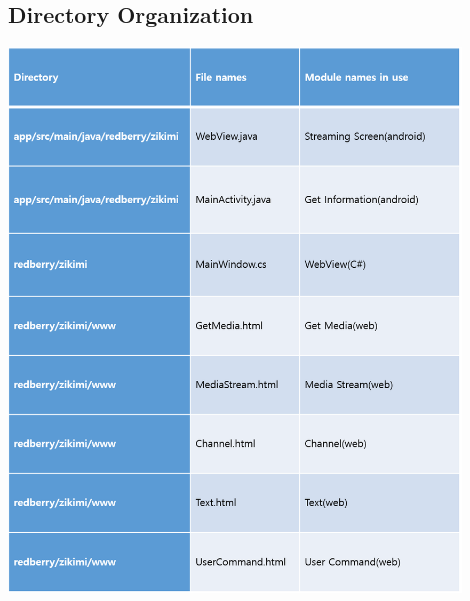 \documentclass[12pt]{article}
\begin{document}
\subsection*{Directory Organization}
\begin{center} 
\includegraphics[width=120mm,scale=1.8]{directory}
\end{center}
\end{document}
